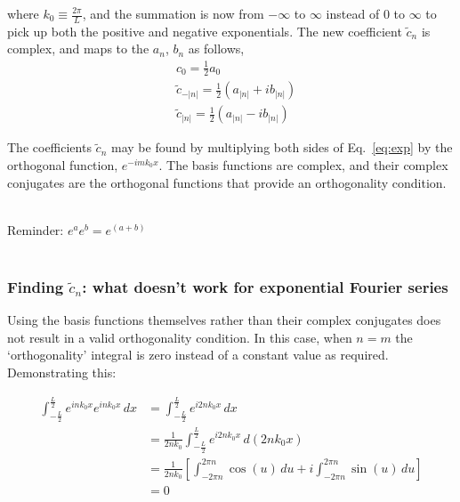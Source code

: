 \documentclass[12pt]{article}
\begin{document}
\begin{flushleft}
where $k_{0} \equiv \frac{2\pi}{L}$, and the summation is now from $-\infty$ to $\infty$ instead of $0$ to $\infty$ to pick up both the positive and negative exponentials.  The new coefficient $\tilde{c}_{n}$ is complex, and maps to the $a_{n}$, $b_{n}$ as follows, 
\begin{equation*}
\begin{aligned}
& c_{0}=\frac{1}{2}a_{0}\\
& \tilde{c}_{-|n|}= \frac{1}{2}(a_{|n|}+ib_{|n|})\\
& \tilde{c}_{|n|}= \frac{1}{2}(a_{|n|}-ib_{|n|})
\end{aligned}
\end{equation*}

The coefficients $\tilde{c}_{n}$ may be found by multiplying both sides of Eq.~\ref{eq:exp} by the orthogonal function, $e^{-imk_{0}x}$.  The basis functions are complex, and their complex conjugates are the orthogonal functions that provide an orthogonality condition.  

{\color{grey} \hrulefill}\\
Reminder: $e^{a}e^{b}=e^{(a+b)}$\\
\vspace{-.1in}
{\color{grey} \hrulefill}\\

\subsubsection*{\bf Finding $\tilde{c}_{n}$: what doesn't work for exponential Fourier series}

Using the basis functions themselves rather than their complex conjugates does not result in a valid orthogonality condition.  In this case, when $n=m$ the `orthogonality' integral is zero instead of a constant value as required.  Demonstrating this:

\begin{equation*}
\begin{aligned}
\int_{-\frac{L}{2}}^{\frac{L}{2}} e^{ink_{0}x}e^{ink_{0}x} \, dx & = \int_{-\frac{L}{2}}^{\frac{L}{2}} e^{i2nk_{0}x} \, dx \\ 
& = \frac{1}{2nk_{0}} \int_{-\frac{L}{2}}^{\frac{L}{2}} e^{i2nk_{0}x} \, d(2nk_{0}x) \\ 
& = \frac{1}{2nk_{0}} \left[ \int_{-2 \pi n}^{2\pi n} \cos{(u)} \, du + i \int_{-2\pi n}^{2\pi n} \sin{(u)} \, du \right] \\
& = 0
\end{aligned}
\end{equation*}


\end{flushleft}
\end{document}

